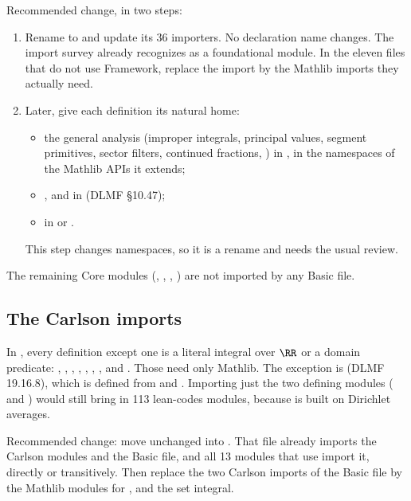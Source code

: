 \documentclass[11pt,a4paper]{article}
\begin{document}
Recommended change, in two steps:
\begin{enumerate}
  \item Rename  to  and update its 36
    importers. No declaration name changes. The import survey already recognizes
     as a foundational module. In the eleven files that do not use
    Framework, replace the import by the Mathlib imports they actually need.
  \item Later, give each definition its natural home:
    \begin{itemize}
      \item the general analysis (improper integrals, principal values, segment primitives,
        sector filters, continued fractions, ) in ,
        in the namespaces of the Mathlib APIs it extends;
      \item {},  and  in
         (DLMF §10.47);
      \item {} in  or
        .
    \end{itemize}
    This step changes namespaces, so it is a rename and needs the usual review.
\end{enumerate}
The remaining Core modules (, ,
, ) are not imported by any Basic file.

\subsection{The Carlson imports}

In , every definition except one is a literal
integral over \(\RR\) or a domain predicate: , ,
, , , ,
,  and . Those need only Mathlib.
The exception is  (DLMF 19.16.8), which is defined from
 and . Importing just the two defining
modules ( and ) would still bring in 113
lean-codes modules, because  is built on Dirichlet averages.

Recommended change: move  unchanged into
. That file already imports the Carlson modules and
the Basic file, and all 13 modules that use  import it, directly or
transitively. Then replace the two Carlson imports of the Basic file by the Mathlib modules for
,  and the set integral.
\end{document}
